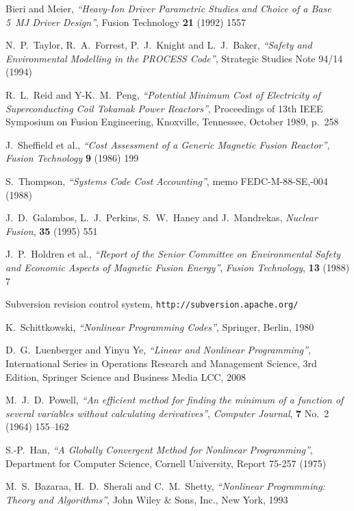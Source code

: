 \documentclass[11pt,a4paper]{report}
\begin{document}
\begin{thebibliography}{99}
Bieri and Meier,
\textit{``Heavy-Ion Driver Parametric Studies and Choice of a Base 5~MJ Driver
  Design''},
Fusion Technology \textbf{21} (1992) 1557

N.\ P.\ Taylor, R.\ A.\ Forrest, P.\ J.\ Knight and L.\ J.\ Baker,
\textit{``Safety and Environmental Modelling in the PROCESS Code''},
Strategic Studies Note 94/14 (1994)

R.\ L.\ Reid and Y-K.\ M.\ Peng,
\textit{``Potential Minimum Cost of Electricity of Superconducting Coil
Tokamak Power Reactors''},
Proceedings of 13th IEEE Symposium on Fusion Engineering, Knoxville,
Tennessee, October 1989, p.\ 258

J.\ Sheffield et al.,
\textit{``Cost Assessment of a Generic Magnetic Fusion Reactor''},
\textit{Fusion Technology} \textbf{9} (1986) 199

S.\ Thompson,
\textit{``Systems Code Cost Accounting''},
memo FEDC-M-88-SE,-004 (1988)

J.\ D.\ Galambos, L.\ J.\ Perkins, S.\ W.\ Haney and J.\ Mandrekas,
\textit{Nuclear Fusion}, \textbf{35} (1995) 551

J.\ P.\ Holdren et al.,
\textit{``Report of the Senior Committee on Environmental Safety and
Economic Aspects of Magnetic Fusion Energy''},
\textit{Fusion Technology}, \textbf{13} (1988) 7

Subversion revision control system, \texttt{http://subversion.apache.org/}

K.\ Schittkowski,
\textit{``Nonlinear Programming Codes''},
Springer, Berlin, 1980

D.\ G.\ Luenberger and Yinyu Ye,
\textit{``Linear and Nonlinear Programming''},
International Series in Operations Research and Management Science, 3rd Edition,
Springer Science and Business Media LCC, 2008

M.\ J.\ D.\ Powell,
\textit{``An efficient method for finding the minimum of a function of several
  variables without calculating derivatives''}, 
\textit{Computer Journal}, \textbf{7} No.\ 2 (1964) 155--162

S.-P.\ Han,
\textit{``A Globally Convergent Method for Nonlinear Programming''},
Department for Computer Science, Cornell University, Report 75-257 (1975)

M.\ S.\ Bazaraa, H.\ D.\ Sherali and C.\ M.\ Shetty,
\textit{``Nonlinear Programming: Theory and Algorithms''},
John Wiley \& Sons, Inc., New York, 1993


\end{thebibliography}
\end{document}
